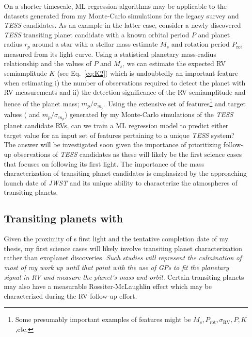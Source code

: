 On a shorter timescale, ML regression algorithms may be applicable to the datasets generated 
from my Monte-Carlo simulations for the \spirou{} legacy survey and \emph{TESS} candidates. 
As an example in the latter case, consider a newly discovered \emph{TESS} transiting planet 
candidate with a known orbital period $P$ and planet radius $r_p$ around a star 
with a stellar mass estimate $M_s$ and rotation period $P_{\mathrm{rot}}$ measured from its 
light curve. Using a statistical planetary mass-radius relationship 
\parencite[e.g.][]{lopez14, weiss14, wolfgang16} and the values of $P$ and $M_s$, we can 
estimate the expected RV semiamplitude $K$ (see Eq.~\ref{eq:K2}) which is undoubtedly an 
important feature when estimating i) the number of observations required to detect the planet 
with RV measurements \nobs{} and ii) the detection significance of the RV semiamplitude and 
hence of the planet mass; $m_p/\sigma_{m_p}$. 
Using the extensive set of features\footnote{Some presumably important examples of features 
might be $M_s, P_{\mathrm{rot}}, \sigma_{\mathrm{RV}}, P, K$,etc.} 
and target values (\nobs{} 
and $m_p/\sigma_{m_p}$) generated by my Monte-Carlo simulations of the 
\emph{TESS} planet candidate RVs, can we train a ML regression model to predict either 
target value for an input set of features pertaining to a unique \emph{TESS} system? 
The answer 
will be investigated soon given the importance of prioritizing \spirou{} follow-up 
observations of \emph{TESS} candidates as these will likely be the first science cases 
that \spirou{} focuses on following its first light. The importance of the mass characterization 
of transiting planet candidates is emphasized by the approaching launch date of \emph{JWST} 
and its unique ability to characterize the atmospheres of transiting planets. 

\subsection{Transiting planets with \spirou{}}
Given the proximity of s first light and the tentative completion date of my thesis, 
my first \spirou{} science cases will likely involve transiting planet characterization rather than 
exoplanet discoveries. \emph{Such studies will represent the culmination of most of my work up until 
that point with the use of GPs to fit the planetary signal in RV and measure the planet's 
mass and orbit}. Certain transiting planets may also have a measurable Rossiter-McLaughlin effect 
which may be characterized during the RV follow-up effort. \\

